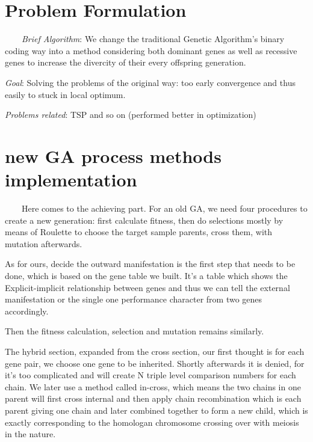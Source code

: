 \documentclass{acmtog} %
\begin{document}
\section{Problem Formulation}
\label{sec:problem_formulation}
\ \ \ \ \emph{Brief Algorithm}: We change the traditional Genetic Algorithm's binary coding way into a method considering both dominant genes as well as recessive genes to increase the divercity of their every offspring generation.

\emph{Goal}: Solving the problems of the original way: too early convergence and thus easily to stuck in local optimum.

\emph{Problems related}: TSP and so on (performed better in optimization)


\section{new GA process methods implementation}
\label{sec:process_methods}
%
\ \ \ \ Here comes to the achieving part. For an old GA, we need four procedures to create a new generation: first calculate fitness, then do selections mostly by means of Roulette to choose the target sample parents, cross them, with mutation afterwards.

As for ours, decide the outward manifestation is the first step that needs to be done, which is based on the gene table we built. It’s a table which shows the Explicit-implicit relationship between genes and thus we can tell the external manifestation or the single one performance character from two genes accordingly. 

Then the fitness calculation, selection and mutation remains similarly. 

The hybrid section, expanded from the cross section, our first thought is for each gene pair, we choose one gene to be inherited. Shortly afterwards it is denied, for it’s too complicated and will create N triple level comparison numbers for each chain. We later use a method called in-cross, which means the two chains in one parent will first cross internal and then apply chain recombination which is each parent giving one chain and later combined together to form a new child, which is exactly corresponding to the homologan chromosome crossing over with meiosis in the nature.
\end{document}
